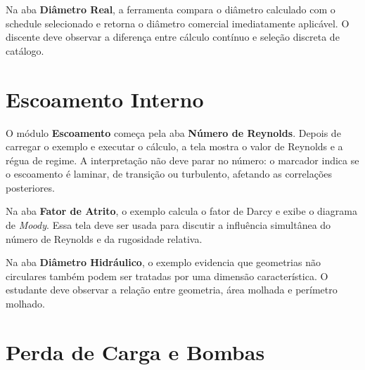 
Na aba \textbf{Diâmetro Real}, a ferramenta compara o diâmetro calculado com o schedule selecionado e retorna o diâmetro comercial imediatamente aplicável. O discente deve observar a diferença entre cálculo contínuo e seleção discreta de catálogo.


\section{Escoamento Interno}

O módulo \textbf{Escoamento} começa pela aba \textbf{Número de Reynolds}. Depois de carregar o exemplo e executar o cálculo, a tela mostra o valor de Reynolds e a régua de regime. A interpretação não deve parar no número: o marcador indica se o escoamento é laminar, de transição ou turbulento, afetando as correlações posteriores.


Na aba \textbf{Fator de Atrito}, o exemplo calcula o fator de Darcy e exibe o diagrama de \textit{Moody}. Essa tela deve ser usada para discutir a influência simultânea do número de Reynolds e da rugosidade relativa.


Na aba \textbf{Diâmetro Hidráulico}, o exemplo evidencia que geometrias não circulares também podem ser tratadas por uma dimensão característica. O estudante deve observar a relação entre geometria, área molhada e perímetro molhado.


\section{Perda de Carga e Bombas}

